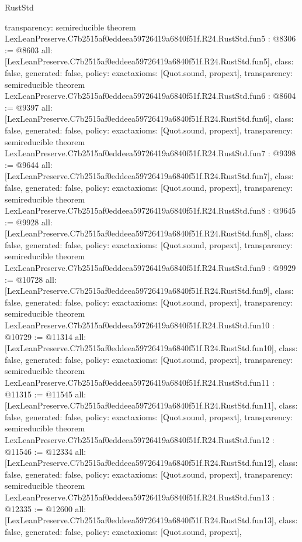\begin{lexlean}{RustStd}
\begin{coremodule}
{  transparency: semireducible
}
theorem LexLeanPreserve.C7b2515af0eddeea59726419a6840f51f.R24.RustStd.fun5 : @8306 := @8603 {
  all: [LexLeanPreserve.C7b2515af0eddeea59726419a6840f51f.R24.RustStd.fun5],
  class: false,
  generated: false,
  policy: exact{axioms: [Quot.sound, propext]},
  transparency: semireducible
}
theorem LexLeanPreserve.C7b2515af0eddeea59726419a6840f51f.R24.RustStd.fun6 : @8604 := @9397 {
  all: [LexLeanPreserve.C7b2515af0eddeea59726419a6840f51f.R24.RustStd.fun6],
  class: false,
  generated: false,
  policy: exact{axioms: [Quot.sound, propext]},
  transparency: semireducible
}
theorem LexLeanPreserve.C7b2515af0eddeea59726419a6840f51f.R24.RustStd.fun7 : @9398 := @9644 {
  all: [LexLeanPreserve.C7b2515af0eddeea59726419a6840f51f.R24.RustStd.fun7],
  class: false,
  generated: false,
  policy: exact{axioms: [Quot.sound, propext]},
  transparency: semireducible
}
theorem LexLeanPreserve.C7b2515af0eddeea59726419a6840f51f.R24.RustStd.fun8 : @9645 := @9928 {
  all: [LexLeanPreserve.C7b2515af0eddeea59726419a6840f51f.R24.RustStd.fun8],
  class: false,
  generated: false,
  policy: exact{axioms: [Quot.sound, propext]},
  transparency: semireducible
}
theorem LexLeanPreserve.C7b2515af0eddeea59726419a6840f51f.R24.RustStd.fun9 : @9929 := @10728 {
  all: [LexLeanPreserve.C7b2515af0eddeea59726419a6840f51f.R24.RustStd.fun9],
  class: false,
  generated: false,
  policy: exact{axioms: [Quot.sound, propext]},
  transparency: semireducible
}
theorem LexLeanPreserve.C7b2515af0eddeea59726419a6840f51f.R24.RustStd.fun10 : @10729 := @11314 {
  all: [LexLeanPreserve.C7b2515af0eddeea59726419a6840f51f.R24.RustStd.fun10],
  class: false,
  generated: false,
  policy: exact{axioms: [Quot.sound, propext]},
  transparency: semireducible
}
theorem LexLeanPreserve.C7b2515af0eddeea59726419a6840f51f.R24.RustStd.fun11 : @11315 := @11545 {
  all: [LexLeanPreserve.C7b2515af0eddeea59726419a6840f51f.R24.RustStd.fun11],
  class: false,
  generated: false,
  policy: exact{axioms: [Quot.sound, propext]},
  transparency: semireducible
}
theorem LexLeanPreserve.C7b2515af0eddeea59726419a6840f51f.R24.RustStd.fun12 : @11546 := @12334 {
  all: [LexLeanPreserve.C7b2515af0eddeea59726419a6840f51f.R24.RustStd.fun12],
  class: false,
  generated: false,
  policy: exact{axioms: [Quot.sound, propext]},
  transparency: semireducible
}
theorem LexLeanPreserve.C7b2515af0eddeea59726419a6840f51f.R24.RustStd.fun13 : @12335 := @12600 {
  all: [LexLeanPreserve.C7b2515af0eddeea59726419a6840f51f.R24.RustStd.fun13],
  class: false,
  generated: false,
  policy: exact{axioms: [Quot.sound, propext]},
}
\end{coremodule}
\end{lexlean}
